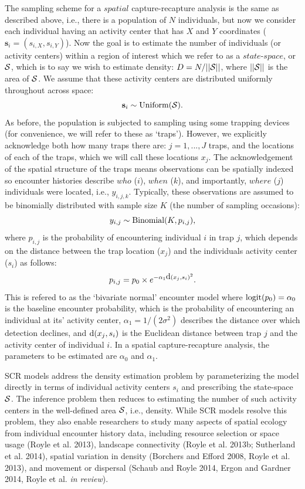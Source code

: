 \documentclass{book}
\begin{document}
The sampling scheme for a $spatial$ capture-recapture analysis is the
same as described above, i.e., there is a population of $N$
individuals, but now we consider each individual having an activity
center that has $X$ and $Y$ coordinates
($\textbf{s}_i=(s_{i,X},s_{i,Y})$). Now the goal is to estimate the
number of individuals (or activity centers) within a region of
interest which we refer to as a $state$-$space$, or ${\cal S}$, which
is to say we wish to estimate density: $D = N/||{\cal S}||$, where
$||{\cal S}||$ is the area of ${\cal S}$. We assume that these
activity centers are distributed uniformly throughout across space:
\[
\textbf{s}_i \sim \hbox{Uniform}({\cal S}).
\]
As before, the population is subjected to sampling using some trapping
devices (for convenience, we will refer to these as `traps'). However,
we explicitly acknowledge both how many traps there are: $j=1,...,J$
traps, and the locations of each of the traps, which we will call
these locations $x_j$. The acknowledgement of the spatial structure of
the traps means observations can be spatially indexed so encounter
histories describe $who$ ($i$), $when$ ($k$), and importantly, $where$
($j$) individuals were located, i.e., $y_{i,j,k}$. Typically, these
observations are assumed to be binomially distributed with sample size
$K$ (the number of sampling occasions):
\[
y_{i,j} \sim \hbox{Binomial}(K,p_{i,j}),
\]
where $p_{i,j}$ is the probability of encountering individual $i$ in
trap $j$, which depends on the distance between the trap location
($x_j$) and the individuals activity center ($s_i$) as follows:
\begin{equation}
p_{i,j} = p_0 \times e^{-\alpha_1 \hbox{d}(x_{j},s_{i})^{2}}.
\end{equation}
This is refered to as the `bivariate normal' encounter model where
$\hbox{logit}(p_0) = \alpha_0$ is the baseline encounter probability,
which is the probability of encountering an individual at its'
activity center, $\alpha_1 = 1/(2\sigma^2)$ describes the distance
over which detection declines, and $\hbox{d}(x_{j},s_{i})$ is the
Euclidean distance between trap $j$ and the activity center of
individual $i$. In a spatial capture-recapture analysis, the
parameters to be estimated are $\alpha_0$ and $\alpha_1$.

SCR models address the density estimation problem by parameterizing
the model directly in terms of individual activity centers $s_i$ and
prescribing the state-space ${\cal S}$. The inference problem then
reduces to estimating the number of such activity centers in the
well-defined area ${\cal S}$, i.e., density. While SCR models resolve
this problem, they also enable researchers to study many aspects of
spatial ecology from individual encounter history data, including
resource selection or space usage (Royle et al. 2013), landscape
connectivity (Royle et al. 2013b; Sutherland et al. 2014), spatial
variation in density (Borchers and Efford 2008, Royle et al. 2013),
and movement or dispersal (Schaub and Royle 2014, Ergon and Gardner
2014, Royle et al. {\it in review}). 
\end{document}
